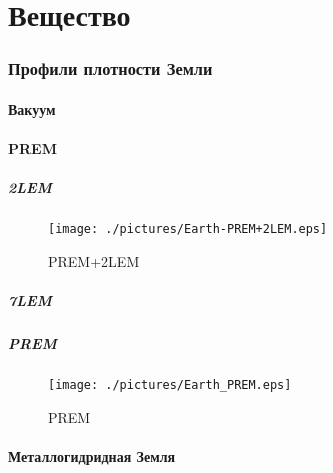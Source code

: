 \part{Вещество}
\section{Профили плотности Земли}
\subsection{Вакуум}
\subsection{PREM}
\subsubsection{2LEM}
\begin{figure}[!ht]
\begin{center}
\texttt{[image: ./pictures/Earth-PREM+2LEM.eps]}
\end{center}
\caption{PREM+2LEM}
\label{PREM+2LEM}
\end{figure}
\subsubsection{7LEM}
\subsubsection{PREM}
\begin{figure}[!ht]
\begin{center}
\texttt{[image: ./pictures/Earth\_PREM.eps]}
\end{center}
\caption{PREM}
\label{PREM}
\end{figure}
\subsection{Металлогидридная Земля}
